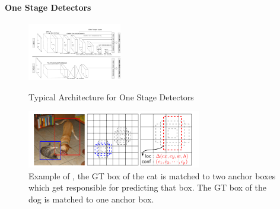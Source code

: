 	

	\paragraph{One Stage Detectors}
	
	\begin{figure}[h]
		\centering
		\begin{minipage}{0.4\textwidth}
			\centering
			\includegraphics[height=2.5cm]{fig/architecture}
			\caption{Typical Architecture for One Stage Detectors}
			\label{fig:architecture}
		\end{minipage}
		\hspace{2cm}
		\begin{minipage}{0.4\textwidth}
			\centering
			\includegraphics[height=2.5cm]{fig/anchors}
			\caption{Example of \cite{Liu}, the GT box of the cat is matched to two anchor boxes which get responsible for predicting that box. The GT box of the dog is matched to one anchor box.}
			\label{fig:anchors}
		\end{minipage}
	\end{figure}
	

